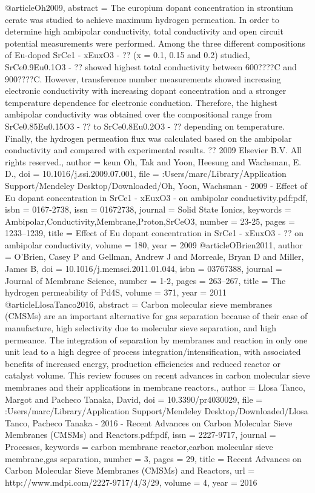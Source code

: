 @article{Oh2009,
abstract = {The europium dopant concentration in strontium cerate was studied to achieve maximum hydrogen permeation. In order to determine high ambipolar conductivity, total conductivity and open circuit potential measurements were performed. Among the three different compositions of Eu-doped SrCe1 - xEuxO3 - ?? (x = 0.1, 0.15 and 0.2) studied, SrCe0.9Eu0.1O3 - ?? showed highest total conductivity between 600????C and 900????C. However, transference number measurements showed increasing electronic conductivity with increasing dopant concentration and a stronger temperature dependence for electronic conduction. Therefore, the highest ambipolar conductivity was obtained over the compositional range from SrCe0.85Eu0.15O3 - ?? to SrCe0.8Eu0.2O3 - ?? depending on temperature. Finally, the hydrogen permeation flux was calculated based on the ambipolar conductivity and compared with experimental results. ?? 2009 Elsevier B.V. All rights reserved.},
author = {keun Oh, Tak and Yoon, Heesung and Wachsman, E. D.},
doi = {10.1016/j.ssi.2009.07.001},
file = {:Users/marc/Library/Application Support/Mendeley Desktop/Downloaded/Oh, Yoon, Wachsman - 2009 - Effect of Eu dopant concentration in SrCe1 - xEuxO3 - on ambipolar conductivity.pdf:pdf},
isbn = {0167-2738},
issn = {01672738},
journal = {Solid State Ionics},
keywords = {Ambipolar,Conductivity,Membrane,Proton,SrCeO3},
number = {23-25},
pages = {1233--1239},
title = {{Effect of Eu dopant concentration in SrCe1 - xEuxO3 - ?? on ambipolar conductivity}},
volume = {180},
year = {2009}
}
@article{OBrien2011,
author = {O'Brien, Casey P and Gellman, Andrew J and Morreale, Bryan D and Miller, James B},
doi = {10.1016/j.memsci.2011.01.044},
isbn = {03767388},
journal = {Journal of Membrane Science},
number = {1-2},
pages = {263--267},
title = {{The hydrogen permeability of Pd4S}},
volume = {371},
year = {2011}
}
@article{LlosaTanco2016,
abstract = {Carbon molecular sieve membranes (CMSMs) are an important alternative for gas separation because of their ease of manufacture, high selectivity due to molecular sieve separation, and high permeance. The integration of separation by membranes and reaction in only one unit lead to a high degree of process integration/intensification, with associated benefits of increased energy, production efficiencies and reduced reactor or catalyst volume. This review focuses on recent advances in carbon molecular sieve membranes and their applications in membrane reactors.},
author = {{Llosa Tanco}, Margot and {Pacheco Tanaka}, David},
doi = {10.3390/pr4030029},
file = {:Users/marc/Library/Application Support/Mendeley Desktop/Downloaded/Llosa Tanco, Pacheco Tanaka - 2016 - Recent Advances on Carbon Molecular Sieve Membranes (CMSMs) and Reactors.pdf:pdf},
issn = {2227-9717},
journal = {Processes},
keywords = {carbon membrane reactor,carbon molecular sieve membrane,gas separation},
number = {3},
pages = {29},
title = {{Recent Advances on Carbon Molecular Sieve Membranes (CMSMs) and Reactors}},
url = {http://www.mdpi.com/2227-9717/4/3/29},
volume = {4},
year = {2016}
}
